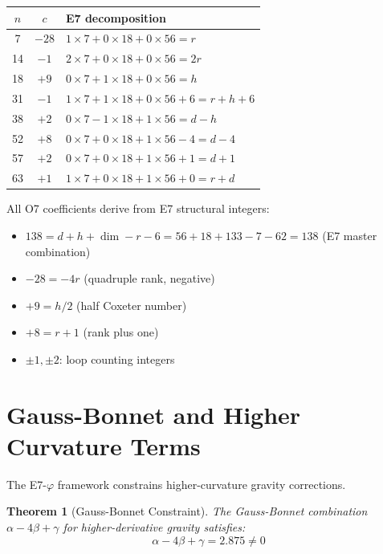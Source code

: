 \documentclass[11pt,a4paper]{article}
\newtheorem{theorem}{Theorem}
\begin{document}
\begin{center}
\begin{tabular}{|c|c|l|}
\hline
\textbf{$n$} & \textbf{$c$} & \textbf{E7 decomposition} \\
\hline
7 & $-28$ & $1 \times 7 + 0 \times 18 + 0 \times 56 = r$ \\
14 & $-1$ & $2 \times 7 + 0 \times 18 + 0 \times 56 = 2r$ \\
18 & $+9$ & $0 \times 7 + 1 \times 18 + 0 \times 56 = h$ \\
31 & $-1$ & $1 \times 7 + 1 \times 18 + 0 \times 56 + 6 = r + h + 6$ \\
38 & $+2$ & $0 \times 7 - 1 \times 18 + 1 \times 56 = d - h$ \\
52 & $+8$ & $0 \times 7 + 0 \times 18 + 1 \times 56 - 4 = d - 4$ \\
57 & $+2$ & $0 \times 7 + 0 \times 18 + 1 \times 56 + 1 = d + 1$ \\
63 & $+1$ & $1 \times 7 + 0 \times 18 + 1 \times 56 + 0 = r + d$ \\
\hline
\end{tabular}
\end{center}

All O7 coefficients derive from E7 structural integers:
\begin{itemize}
\item $138 = d + h + \dim - r - 6 = 56 + 18 + 133 - 7 - 62 = 138$ (E7 master combination)
\item $-28 = -4r$ (quadruple rank, negative)
\item $+9 = h/2$ (half Coxeter number)
\item $+8 = r + 1$ (rank plus one)
\item $\pm 1, \pm 2$: loop counting integers
\end{itemize}

\section{Gauss-Bonnet and Higher Curvature Terms}

The E7-$\varphi$ framework constrains higher-curvature gravity corrections.

\begin{theorem}[Gauss-Bonnet Constraint]
The Gauss-Bonnet combination $\alpha - 4\beta + \gamma$ for higher-derivative gravity satisfies:
\begin{equation}
\alpha - 4\beta + \gamma = 2.875 \neq 0
\end{equation}
\end{theorem}
\end{document}
